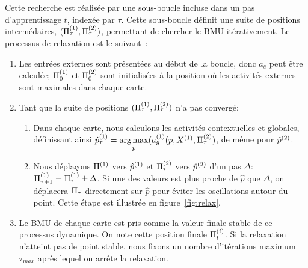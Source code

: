 \documentclass[../main]{subfiles}
\begin{document}
Cette recherche est réalisée par une sous-boucle incluse dans un pas d'apprentissage $t$, indexée par $\tau$. Cette sous-boucle définit une suite de positions intermédaires, $(\Pi^{({1})}_\tau , \Pi^{({2})}_\tau)$, permettant de chercher le BMU itérativement.
Le processus de relaxation est le suivant~:
\begin{enumerate}
\item Les entrées externes sont présentées au début de la boucle, donc $a_e$ peut être calculée; $\Pi^{({1})}_0$ et $\Pi^{({2})}_0$ sont initialisées à la position où les activités externes sont maximales dans chaque carte. 
\item Tant que la suite de positions $(\Pi^{({1})}_\tau,\Pi^{({2})}_\tau)$ n'a pas convergé:
	\begin{enumerate}
	\item Dans chaque carte, nous calculons les activités contextuelles et globales, définissant ainsi $\hat{p}^{({1})}_\tau = \operatorname*{arg\,max}\limits_p(a_g^{({1})}(p,X^{({1})}, \Pi^{({2})}_\tau)$, de même pour $\hat{p}^{({2})}$.
	\item Nous déplaçons $\Pi^{({1})}$ vers $\hat{p}^{({1})}$ et $\Pi^{({2})}_\tau$ vers $\hat{p}^{({2})}$ d'un pas $\Delta$: $\Pi^{({1})}_{\tau+1} = \Pi^{({1})}_{\tau} \pm \Delta$.
	Si une des valeurs est plus proche de $\hat{p}$ que $\Delta$, on déplacera $\Pi_\tau$ directement sur $\hat{p}$ pour éviter les oscillations autour du point. Cette étape est illustrée en figure~\ref{fig:relax}.
	\end{enumerate}
\item Le BMU de chaque carte est pris comme la valeur finale stable de ce processus dynamique. On note cette position finale $\Pi^{({i})}_t$.
Si la relaxation n'atteint pas de point stable, nous fixons un nombre d'itérations maximum $\tau_{max}$ après lequel on arrête la relaxation.
\end{enumerate}
\end{document}
